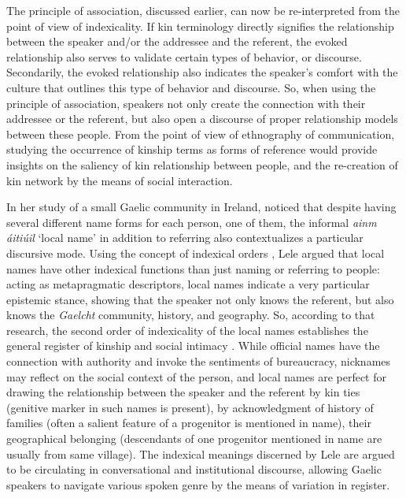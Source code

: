 \documentclass[12pt]{article}
\begin{document}
The principle of association, discussed earlier, can now be re-interpreted from the point of view of indexicality. If kin terminology directly signifies the relationship between the speaker and/or the addressee and the referent, the evoked relationship also serves to validate certain types of behavior, or discourse. Secondarily, the evoked relationship also indicates the speaker's comfort with the culture that outlines this type of behavior and discourse. So, when using the principle of association, speakers not only create the connection with their addressee or the referent, but also open a discourse of proper relationship models between these people. From the point of view of ethnography of communication, studying the occurrence of kinship terms as forms of reference would provide insights on the saliency of kin relationship between people, and the re-creation of kin network by the means of social interaction.

In her study of a small Gaelic community in Ireland, \textcite{lele2009} noticed that despite having several different name forms for each person, one of them, the informal \textit{ainm \'aiti\'uil} `local name' in addition to referring also contextualizes a particular discursive mode. Using the concept of indexical orders \parencite{silverstein2003}, Lele argued that local names have other indexical functions than just naming or referring to people: acting as metapragmatic descriptors, local names indicate a very particular epistemic stance, showing that the speaker not only knows the referent, but also knows the \textit{Gaelcht} community, history, and geography. So, according to that research, the second order of indexicality of the local names establishes the general register of kinship and social intimacy \parencite{lele2009}. While official names have the connection with authority and invoke the sentiments of bureaucracy, nicknames may reflect on the social context of the person, and local names are perfect for drawing the relationship between the speaker and the referent by kin ties (genitive marker in such names is present), by acknowledgment of history of families (often a salient feature of a progenitor is mentioned in name), their geographical belonging (descendants of one progenitor mentioned in name are usually from same village). The indexical meanings discerned by Lele are argued to be circulating in conversational and institutional discourse, allowing Gaelic speakers to navigate various spoken genre by the means of variation in register.
\end{document}
